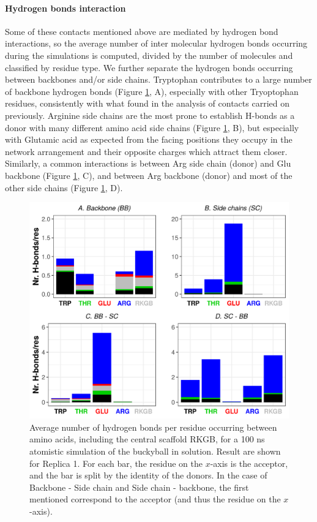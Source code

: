 \paragraph{Hydrogen bonds interaction} Some of these contacts mentioned above are mediated by hydrogen bond interactions, so the average number of inter molecular hydrogen bonds occurring during the simulations is computed, divided by the number of molecules and classified by residue type.
We further separate the hydrogen bonds occurring between backbones and/or side chains. Tryptophan contributes to a large number of backbone hydrogen bonds (Figure \ref{fig:BTI_hbonds}, A), especially with other Tryoptophan residues, consistently with what found in the analysis of contacts carried on previously. Arginine side chains are the most prone to establish H-bonds as a donor with many different amino acid side chains (Figure \ref{fig:BTI_hbonds}, B), but especially with Glutamic acid as expected from the facing positions they occupy in the network arrangement and their opposite charges which attract them closer.
%
Similarly, a common interactions is between Arg side chain (donor) and Glu backbone (Figure \ref{fig:BTI_hbonds}, C), and between Arg backbone (donor) and most of the other side chains (Figure \ref{fig:BTI_hbonds}, D).
\begin{figure}[t]
\centering
\includegraphics[width=0.85\linewidth]{3results_capsule/pics/Hb_all.png} 
\caption[Hydrogen bonds between molecules in the buckyball]{Average number of hydrogen bonds per residue occurring between amino acids, including the central scaffold RKGB, for a 100 ns atomistic simulation of the buckyball in solution. Result are shown for Replica 1. For each bar, the residue on the $x$-axis is the acceptor, and the bar is split by the identity of the donors. In the case of Backbone - Side chain and Side chain - backbone, the first mentioned correspond to the acceptor (and thus the residue on the $x$-axis).}
\label{fig:BTI_hbonds}
\end{figure}

